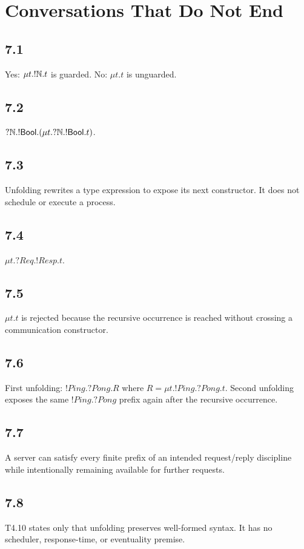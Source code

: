 \chapter{Conversations That Do Not End}

\section*{7.1}
Yes: $\mu t.!\mathbb{N}.t$ is guarded. No: $\mu t.t$ is unguarded.

\section*{7.2}
$?\mathbb{N}.!\mathsf{Bool}.(\mu t.?\mathbb{N}.!\mathsf{Bool}.t)$.

\section*{7.3}
Unfolding rewrites a type expression to expose its next constructor. It does not schedule or execute a process.

\section*{7.4}
$\mu t.?Req.!Resp.t$.

\section*{7.5}
$\mu t.t$ is rejected because the recursive occurrence is reached without crossing a communication constructor.

\section*{7.6}
First unfolding: $!Ping.?Pong.R$ where $R=\mu t.!Ping.?Pong.t$. Second unfolding exposes the same $!Ping.?Pong$ prefix again after the recursive occurrence.

\section*{7.7}
A server can satisfy every finite prefix of an intended request/reply discipline while intentionally remaining available for further requests.

\section*{7.8}
T4.10 states only that unfolding preserves well-formed syntax. It has no scheduler, response-time, or eventuality premise.

